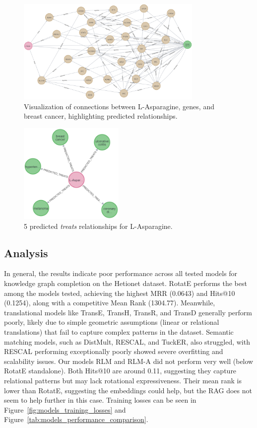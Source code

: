\begin{figure}[ht]
    \centering
    \includegraphics[width=0.8\textwidth]{images/pykeen/results}
    \caption{Visualization of connections between L-Asparagine, genes, and breast cancer, highlighting predicted relationships.}
    \label{fig:kg_visualization}
\end{figure}

\begin{figure}[ht]
    \centering
    \includegraphics[width=0.45\textwidth]{images/pykeen/predicted treats}
    \caption{5 predicted \textit{treats} relationships for L-Asparagine.}
    \label{fig:predicted_treats}
\end{figure}


\subsection*{Analysis}
In general, the results indicate poor performance across all tested models for knowledge graph completion on the Hetionet dataset.
RotatE performs the best among the models tested, achieving the highest MRR (0.0643) and Hits@10 (0.1254), along with a competitive Mean Rank (1304.77).
Meanwhile, translational models like TransE, TransH, TransR, and TransD generally perform poorly, likely due to simple geometric assumptions (linear or relational translations) that fail to capture complex patterns in the dataset. Semantic matching models, such as DistMult, RESCAL, and TuckER, also struggled, with RESCAL performing exceptionally poorly showed severe overfitting and scalability issues.
Our models RLM and RLM-A did not perform very well (below RotatE standalone).
Both Hits@10 are around 0.11, suggesting they capture relational patterns but may lack rotational expressiveness.
Their mean rank is lower than RotatE, suggesting the embeddings could help, but the RAG does not seem to help further in this case.
Training losses can be seen in Figure~\ref{fig:models_training_losses} and Figure~\ref{tab:models_performance_comparison}.

